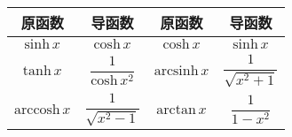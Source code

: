 \documentclass[UTF8, 12pt]{ctexart}
\begin{document}
\begin{center}
    \begin{tabular}{|c|c|c|c|}
        \hline
        原函数 & 导函数 & 原函数 & 导函数\\ \hline
        $\textrm{sinh}\,x$ & $\textrm{cosh}\,x$ & $\textrm{cosh}\,x$ & $\textrm{sinh}\,x$ \\ \hline
        $\textrm{tanh}\,x$ & $\dfrac{1}{\textrm{cosh}\,x^2}$ & $\textrm{arcsinh}\,x$ & $\dfrac{1}{\sqrt{x^2+1}}$ \\ \hline
        $\textrm{arccosh}\,x$ & $\dfrac{1}{\sqrt{x^2-1}}$ & $\textrm{arctan}\,x$ & $\dfrac{1}{1-x^2}$ \\
        \hline
    \end{tabular}
\end{center}
\end{document}
